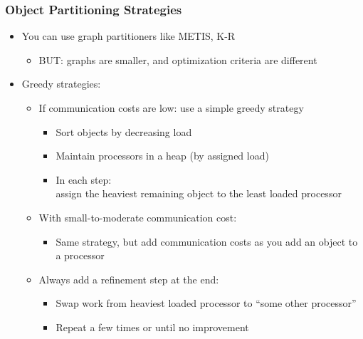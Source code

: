 \begin{frame}[fragile]
\frametitle{Object Partitioning Strategies}
\begin{itemize}
 \item You can use graph partitioners like METIS, K-R
 \begin{itemize}
  \item BUT: graphs are smaller, and optimization criteria are different
 \end{itemize}
 \item Greedy strategies:
 \begin{itemize}
  \item If communication costs are low: use a simple greedy strategy
  \begin{itemize}
   \item Sort objects by decreasing load
   \item Maintain processors in a heap (by assigned load)
   \item In each step: \\
   assign the heaviest remaining object to the least loaded processor
  \end{itemize}
  \item With small-to-moderate communication cost:
  \begin{itemize}
   \item Same strategy, but add communication costs as you add an object to a processor
  \end{itemize}
  \item Always add a refinement step at the end:
  \begin{itemize}
   \item Swap work from heaviest loaded processor to ``some other processor''
   \item Repeat a few times or until no improvement 
  \end{itemize}
 \end{itemize}
\end{itemize}
\end{frame}


